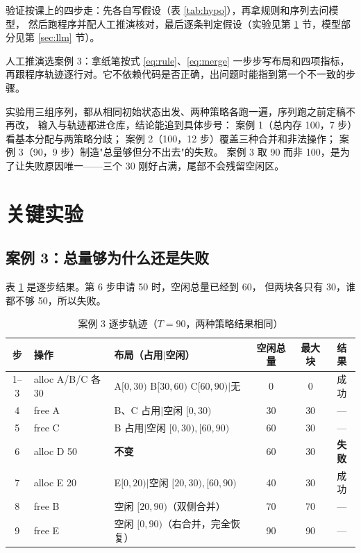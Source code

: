 \documentclass[12pt,a4paper]{ctexart}
\begin{document}
验证按课上的四步走：先各自写假设（表 \ref{tab:hypo}），再拿规则和序列去问模型，
然后跑程序并配人工推演核对，最后逐条判定假设（实验见第 \ref{sec:result} 节，模型部分见第 \ref{sec:llm} 节）。

人工推演选案例 3：拿纸笔按式 \eqref{eq:rule}、\eqref{eq:merge} 一步步写布局和四项指标，
再跟程序轨迹逐行对。它不依赖代码是否正确，出问题时能指到第一个不一致的步骤。

实验用三组序列，都从相同初始状态出发、两种策略各跑一遍，序列跑之前定稿不再改，
输入与轨迹都进仓库，结论能追到具体步号：
案例 1（总内存 100，7 步）看基本分配与两策略分歧；
案例 2（100，12 步）覆盖三种合并和非法操作；
案例 3（90，9 步）制造"总量够但分不出去"的失败。
案例 3 取 90 而非 100，是为了让失败原因唯一——三个 30 刚好占满，尾部不会残留空闲区。

\clearpage
\section{关键实验}\label{sec:result}

\subsection{案例 3：总量够为什么还是失败}

表 \ref{tab:case3} 是逐步结果。第 6 步申请 50 时，空闲总量已经到 60，
但两块各只有 30，谁都不够 50，所以失败。

\begin{table}[htbp]
    \centering
    \caption{案例 3 逐步轨迹（$T=90$，两种策略结果相同）}
    \label{tab:case3}
    \footnotesize
    \setlength{\tabcolsep}{4pt}
    \begin{tabular}{cl>{\raggedright\arraybackslash}p{4.7cm}ccc}
        \toprule
        步 & 操作 & 布局（占用$\mid$空闲） & 空闲总量 & 最大块 & 结果 \\
        \midrule
        1--3 & alloc A/B/C 各 30 & A$[0,30)$ B$[30,60)$ C$[60,90)$$\mid$无 & 0 & 0 & 成功 \\
        4 & free A & B、C 占用$\mid$空闲 $[0,30)$ & 30 & 30 & --- \\
        5 & free C & B 占用$\mid$空闲 $[0,30),[60,90)$ & 60 & 30 & --- \\
        6 & alloc D 50 & \textbf{不变} & 60 & 30 & \textbf{失败} \\
        7 & alloc E 20 & E$[0,20)$$\mid$空闲 $[20,30),[60,90)$ & 40 & 30 & 成功 \\
        8 & free B & 空闲 $[20,90)$（双侧合并） & 70 & 70 & --- \\
        9 & free E & 空闲 $[0,90)$（右合并，完全恢复） & 90 & 90 & --- \\
        \bottomrule
    \end{tabular}
\end{table}
\end{document}
